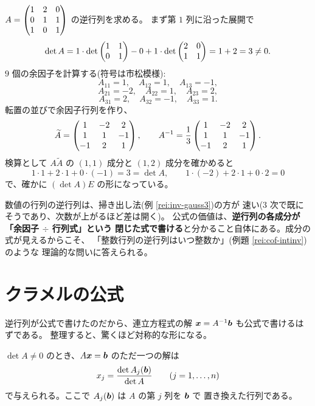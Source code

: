 \begin{rei}[$3$ 次の逆行列を公式で求める]\label{rei:cof-inverse}
$A = \begin{pmatrix}1 & 2 & 0 \\ 0 & 1 & 1 \\ 1 & 0 & 1\end{pmatrix}$ の逆行列を求める。
まず第 $1$ 列に沿った展開で
\[
\det A = 1 \cdot \det \begin{pmatrix}1 & 1 \\ 0 & 1\end{pmatrix} - 0 + 1 \cdot \det \begin{pmatrix}2 & 0 \\ 1 & 1\end{pmatrix}
= 1 + 2 = 3 \neq 0.
\]
$9$ 個の余因子を計算する(符号は市松模様):
\[
A_{11} = 1, \quad A_{12} = 1, \quad A_{13} = -1,
\]
\[
A_{21} = -2, \quad A_{22} = 1, \quad A_{23} = 2,
\]
\[
A_{31} = 2, \quad A_{32} = -1, \quad A_{33} = 1.
\]
転置の並びで余因子行列を作り、
\[
\widetilde{A} = \begin{pmatrix}1 & -2 & 2 \\ 1 & 1 & -1 \\ -1 & 2 & 1\end{pmatrix}, \qquad
A^{-1} = \frac{1}{3}\begin{pmatrix}1 & -2 & 2 \\ 1 & 1 & -1 \\ -1 & 2 & 1\end{pmatrix}.
\]
検算として $A\widetilde{A}$ の $(1,1)$ 成分と $(1,2)$ 成分を確かめると
\[
1 \cdot 1 + 2 \cdot 1 + 0 \cdot (-1) = 3 = \det A, \qquad
1 \cdot (-2) + 2 \cdot 1 + 0 \cdot 2 = 0
\]
で、確かに $(\det A)E$ の形になっている。
\end{rei}

\begin{chui}
数値の行列の逆行列は、掃き出し法(例 \ref{rei:inv-gauss3})の方が
速い($3$ 次で既にそうであり、次数が上がるほど差は開く)。
公式の価値は、\textbf{逆行列の各成分が「余因子 $\div$ 行列式」という
閉じた式で書ける}と分かること自体にある。成分の式が見えるからこそ、
「整数行列の逆行列はいつ整数か」(例題 \ref{rei:cof-intinv})のような
理論的な問いに答えられる。
\end{chui}

\section{クラメルの公式}

逆行列が公式で書けたのだから、連立方程式の解
$\bm{x} = A^{-1}\bm{b}$ も公式で書けるはずである。
整理すると、驚くほど対称的な形になる。

\begin{teiri}[クラメルの公式]\label{thm:cramer}
$\det A \neq 0$ のとき、$A\bm{x} = \bm{b}$ のただ一つの解は
\[
x_j = \frac{\det A_j(\bm{b})}{\det A}
\qquad (j = 1, \dots, n)
\]
で与えられる。ここで $A_j(\bm{b})$ は $A$ の第 $j$ 列を $\bm{b}$ で
置き換えた行列である。
\end{teiri}

